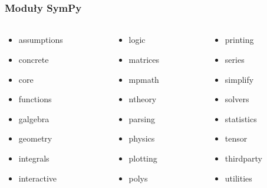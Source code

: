 \documentclass[10pt]{beamer}
\begin{document}
\begin{frame}
    \frametitle{Moduły SymPy}
    \framesubtitle{}

    \begin{columns}
        \begin{column}[l]{0.3\textwidth}
            \begin{itemize}
                \item assumptions
                \item concrete
                \item core
                \item functions
                \item galgebra
                \item geometry
                \item integrals
                \item interactive
            \end{itemize}
        \end{column}
        \begin{column}[l]{0.3\textwidth}
            \begin{itemize}
                \item logic
                \item matrices
                \item mpmath
                \item ntheory
                \item parsing
                \item physics
                \item plotting
                \item polys
            \end{itemize}
        \end{column}
        \begin{column}[l]{0.3\textwidth}
            \begin{itemize}
                \item printing
                \item series
                \item simplify
                \item solvers
                \item statistics
                \item tensor
                \item thirdparty
                \item utilities
            \end{itemize}
        \end{column}
    \end{columns}
\end{frame}
\end{document}
